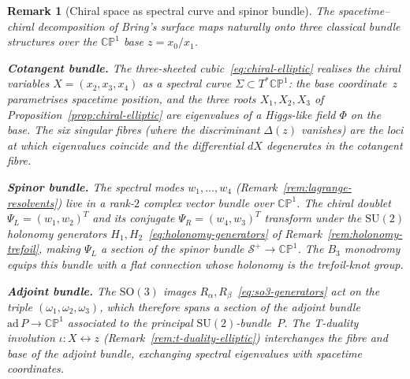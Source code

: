 \documentclass[12pt,a4paper]{report}
\newtheorem{remark}[theorem]{Remark}
\begin{document}
\begin{remark}[Chiral space as spectral curve and spinor bundle]
\label{rem:chiral-bundles}
The spacetime--chiral decomposition of Bring's surface maps naturally onto
three classical bundle structures over the $\mathbb{CP}^1$ base $z=x_0/x_1$.

\medskip
\noindent\textbf{Cotangent bundle.}\;
The three-sheeted cubic~\eqref{eq:chiral-elliptic} realises the chiral
variables $X=(x_2,x_3,x_4)$ as a \emph{spectral curve}
$\Sigma\subset T^{*}\mathbb{CP}^1$: the base coordinate~$z$ parametrises
spacetime position, and the three roots $X_1,X_2,X_3$ of
Proposition~\ref{prop:chiral-elliptic} are eigenvalues of a Higgs-like
field $\Phi$ on the base.  The six singular fibres (where the discriminant
$\Delta(z)$ vanishes) are the loci at which eigenvalues coincide and the
differential $dX$ degenerates in the cotangent fibre.

\medskip
\noindent\textbf{Spinor bundle.}\;
The spectral modes $w_1,\dots,w_4$
(Remark~\ref{rem:lagrange-resolvents}) live in a rank-$2$ complex vector
bundle over $\mathbb{CP}^1$.  The chiral doublet
$\Psi_L=(w_1,w_2)^T$ and its conjugate $\Psi_R=(w_4,w_3)^T$ transform
under the $\mathrm{SU}(2)$ holonomy generators
$H_1,H_2$~\eqref{eq:holonomy-generators} of
Remark~\ref{rem:holonomy-trefoil}, making $\Psi_L$ a section of the
\emph{spinor bundle} $\mathcal{S}^{+}\to\mathbb{CP}^1$.  The $B_3$
monodromy equips this bundle with a flat connection whose holonomy is the
trefoil-knot group.

\medskip
\noindent\textbf{Adjoint bundle.}\;
The $\mathrm{SO}(3)$ images $R_\alpha,R_\beta$~\eqref{eq:so3-generators}
act on the triple $(\omega_1,\omega_2,\omega_3)$, which therefore spans a
section of the adjoint bundle $\mathrm{ad}\,P\to\mathbb{CP}^1$ associated
to the principal $\mathrm{SU}(2)$-bundle~$P$.  The T-duality involution
$\iota\colon X\leftrightarrow z$ (Remark~\ref{rem:t-duality-elliptic})
interchanges the fibre and base of the adjoint bundle, exchanging
spectral eigenvalues with spacetime coordinates.
\end{remark}
\end{document}
